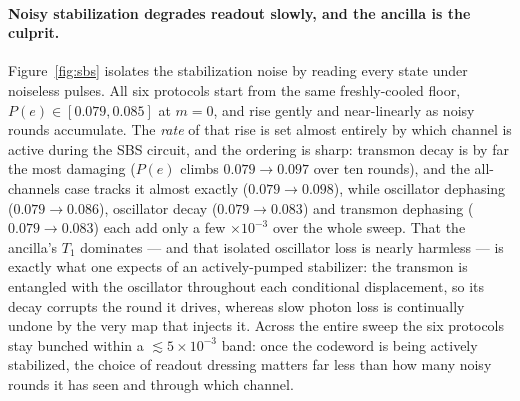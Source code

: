 \paragraph{Noisy stabilization degrades readout slowly, and the ancilla is the culprit.}
Figure~\ref{fig:sbs} isolates the stabilization noise by reading every state under noiseless
pulses. All six protocols start from the same freshly-cooled floor, $P(e)\in[0.079,0.085]$ at
$m=0$, and rise gently and near-linearly as noisy rounds accumulate. The \emph{rate} of that rise
is set almost entirely by which channel is active during the SBS circuit, and the ordering is
sharp: transmon decay is by far the most damaging ($P(e)$ climbs $0.079\!\to\!0.097$ over ten
rounds), and the all-channels case tracks it almost exactly ($0.079\!\to\!0.098$), while
oscillator dephasing ($0.079\!\to\!0.086$), oscillator decay ($0.079\!\to\!0.083$) and transmon
dephasing ($0.079\!\to\!0.083$) each add only a few $\times10^{-3}$ over the whole sweep. That the
ancilla's $T_1$ dominates --- and that isolated oscillator loss is nearly harmless --- is exactly
what one expects of an actively-pumped stabilizer: the transmon is entangled with the oscillator
throughout each conditional displacement, so its decay corrupts the round it drives, whereas slow
photon loss is continually undone by the very map that injects it. Across the entire sweep the six
protocols stay bunched within a $\lesssim5\times10^{-3}$ band: once the codeword is being actively
stabilized, the choice of readout dressing matters far less than how many noisy rounds it has seen
and through which channel.

